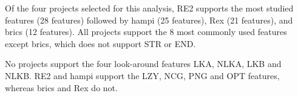 Of the four projects selected for this analysis, RE2 supports the most studied features (28 features) followed by hampi (25 features),  Rex (21 features), and brics (12 features).  All projects support the 8 most commonly used features except brics, which does not support STR or END.

No projects support the four look-around features LKA, NLKA, LKB and NLKB.  RE2 and hampi support the LZY, NCG, PNG and OPT features, whereas brics and Rex do not.






